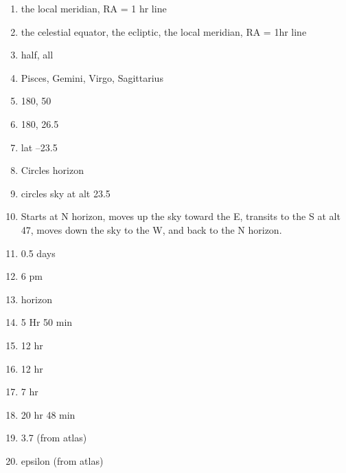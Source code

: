 \begin{enumerate} 

\item 

the local meridian, RA = 1 hr line

\item 
the celestial equator, the ecliptic,
the local meridian, RA = 1hr line

\item
half, all

\item

Pisces,  Gemini, Virgo, Sagittarius

\item
180\deg, 50\deg


\item
180\deg, 26.5\deg

\item
lat --23.5\deg

\item
Circles horizon

\item
circles sky at alt 23.5\deg

\item
Starts at N horizon, moves up the sky toward the E, transits to the S
at alt 47\deg, moves down the sky to the W, and back to the N horizon.

\item
0.5 days


\item 
6 pm 

\item 
horizon 

\item
5 Hr 50 min

\item
12 hr 

\item
12 hr

\item
7 hr

\item
20 hr 48 min 

   
\item
3.7 (from atlas)

\item
epsilon (from atlas)



\end{enumerate} 













